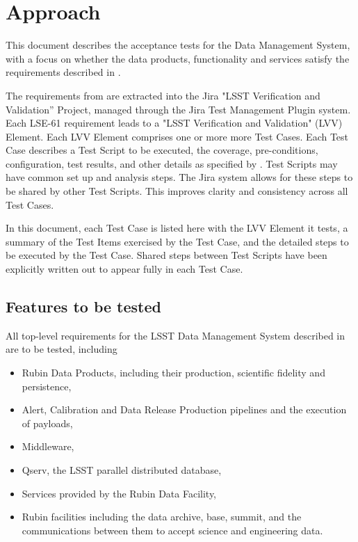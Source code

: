 \documentclass[DM,lsstdraft,STS,toc]{lsstdoc}
\begin{document}
\section{Approach}
\label{sec:approach}

This document describes the acceptance tests for the  Data Management System,
with a focus on whether the data products, functionality and services satisfy the requirements described in .

The requirements from  are extracted into the Jira "LSST Verification and Validation'' Project, managed through the Jira Test Management Plugin system.  
Each LSE-61 requirement leads to a "LSST Verification and Validation" (LVV) Element.  
Each LVV Element comprises one or more more Test Cases.  
Each Test Case describes a Test Script to be executed, the coverage, pre-conditions, configuration, test results, and other details as specified by . 
Test Scripts may have common set up and analysis steps. 
The Jira system allows for these steps to be shared by other Test Scripts.  This improves clarity and consistency across all Test Cases.

In this document, each Test Case is listed here with the LVV Element it tests, a summary of the Test Items exercised by the Test Case, and the detailed steps to be executed by the Test Case.  
Shared steps between Test Scripts have been explicitly written out to appear fully in each Test Case.

\subsection{Features to be tested}
\label{sec:feat2test}

All top-level requirements for the LSST Data Management System described in  are to be tested, including
\begin{itemize}
\item Rubin Data Products, including their production, scientific fidelity and persistence, 
\item Alert, Calibration and Data Release Production pipelines and the execution of payloads, 
\item Middleware,
\item Qserv, the LSST parallel distributed database,
\item Services provided by the Rubin Data Facility,
\item Rubin facilities including the data archive, base, summit, and the communications between them to accept science and engineering data.
\end{itemize}
\end{document}
